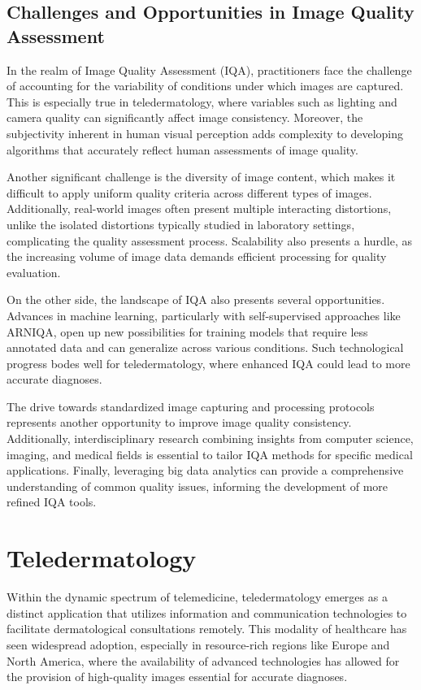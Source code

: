 \subsection{Challenges and Opportunities in Image Quality Assessment}
\label{sub:ChallengesOpportunitiesIQA}
In the realm of Image Quality Assessment (IQA), practitioners face the challenge of accounting for the variability of conditions under which images are captured. This is especially true in teledermatology, where variables such as lighting and camera quality can significantly affect image consistency. Moreover, the subjectivity inherent in human visual perception adds complexity to developing algorithms that accurately reflect human assessments of image quality.\par
\vspace{\baselineskip}
\noindent
Another significant challenge is the diversity of image content, which makes it difficult to apply uniform quality criteria across different types of images. Additionally, real-world images often present multiple interacting distortions, unlike the isolated distortions typically studied in laboratory settings, complicating the quality assessment process. Scalability also presents a hurdle, as the increasing volume of image data demands efficient processing for quality evaluation.\par
\vspace{\baselineskip}
\noindent
On the other side, the landscape of IQA also presents several opportunities. Advances in machine learning, particularly with self-supervised approaches like ARNIQA, open up new possibilities for training models that require less annotated data and can generalize across various conditions. Such technological progress bodes well for teledermatology, where enhanced IQA could lead to more accurate diagnoses.\par
\vspace{\baselineskip}
\noindent
The drive towards standardized image capturing and processing protocols represents another opportunity to improve image quality consistency. Additionally, interdisciplinary research combining insights from computer science, imaging, and medical fields is essential to tailor IQA methods for specific medical applications. Finally, leveraging big data analytics can provide a comprehensive understanding of common quality issues, informing the development of more refined IQA tools. \par


\section{Teledermatology}
\label{sec:Teledermatology}
Within the dynamic spectrum of telemedicine, teledermatology emerges as a distinct application that utilizes information and communication technologies to facilitate dermatological consultations remotely. This modality of healthcare has seen widespread adoption, especially in resource-rich regions like Europe and North America, where the availability of advanced technologies has allowed for the provision of high-quality images essential for accurate diagnoses. \par

